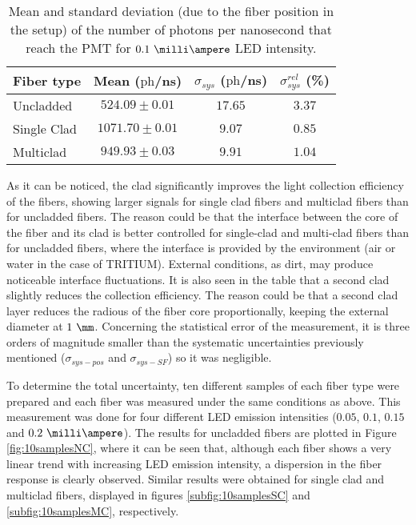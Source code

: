 \begin{table}[htbp]
\centering{}%
\begin{tabular}{lccc}
\toprule 
Fiber type & Mean ($\text{ph}$/ns) & $\sigma_{sys}$ ($\text{ph}$/ns) & $\sigma^{rel}_{sys}$ (\%) \tabularnewline
\midrule
\midrule 
Uncladded & $524.09 \pm 0.01$ & $17.65$ & $3.37$ \tabularnewline
Single Clad & $1071.70 \pm 0.01$ & $9.07$ & $0.85$ \tabularnewline
Multiclad & $949.93 \pm 0.03$ & $9.91$ & $1.04$ \tabularnewline
\bottomrule
\end{tabular}
\caption{Mean and standard deviation (due to the fiber position in the setup) of the number of photons per nanosecond that reach the PMT for $0.1~\milli\ampere$ LED intensity.}
\label{tab:PositionStandardDeviation}
\end{table}
As it can be noticed, the clad significantly improves the light collection efficiency of the fibers, showing larger signals for single clad fibers and multiclad fibers than for uncladded fibers. The reason could be that the interface between the core of the fiber and its clad is better controlled for single-clad and multi-clad fibers than for uncladded fibers, where the interface is provided by the environment (air or water in the case of TRITIUM). External conditions, as dirt, may produce noticeable interface fluctuations. It is also seen in the table that a second clad slightly reduces the collection efficiency. The reason could be that a second clad layer reduces the radious of the fiber core proportionally, keeping the external diameter at $1~\mm$. Concerning the statistical error of the measurement, it is three orders of magnitude smaller than the systematic uncertainties previously mentioned ($\sigma_{sys-pos}$ and $\sigma_{sys-SF}$) so it was negligible.


To determine the total uncertainty, ten different samples of each fiber type were prepared and each fiber was measured under the same conditions as above. This measurement was done for four different LED emission intensities ($0.05$, $0.1$, $0.15$ and $0.2~\milli\ampere$). The results for uncladded fibers are plotted in Figure \ref{fig:10samplesNC}, where it can be seen that, although each fiber shows a very linear trend with increasing LED emission intensity, a dispersion in the fiber response is clearly observed. Similar results were obtained for single clad and multiclad fibers, displayed in figures \ref{subfig:10samplesSC} and \ref{subfig:10samplesMC}, respectively.

